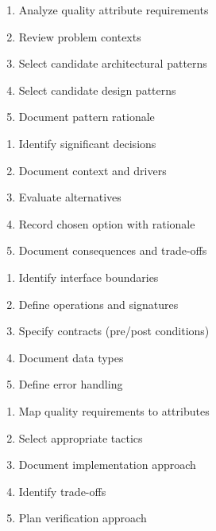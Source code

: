 \documentclass[11pt,letterpaper]{article}
\begin{document}
\begin{guidancebox}
\begin{enumerate}[nosep]
    \item Analyze quality attribute requirements
    \item Review problem contexts
    \item Select candidate architectural patterns
    \item Select candidate design patterns
    \item Document pattern rationale
\end{enumerate}
\end{guidancebox}

\begin{guidancebox}
\begin{enumerate}[nosep]
    \item Identify significant decisions
    \item Document context and drivers
    \item Evaluate alternatives
    \item Record chosen option with rationale
    \item Document consequences and trade-offs
\end{enumerate}
\end{guidancebox}

\begin{guidancebox}
\begin{enumerate}[nosep]
    \item Identify interface boundaries
    \item Define operations and signatures
    \item Specify contracts (pre/post conditions)
    \item Document data types
    \item Define error handling
\end{enumerate}
\end{guidancebox}

\begin{guidancebox}
\begin{enumerate}[nosep]
    \item Map quality requirements to attributes
    \item Select appropriate tactics
    \item Document implementation approach
    \item Identify trade-offs
    \item Plan verification approach
\end{enumerate}
\end{guidancebox}
\end{document}
